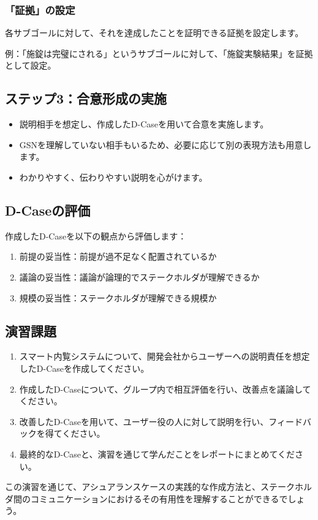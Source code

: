 \subsubsection{「証拠」の設定}
各サブゴールに対して、それを達成したことを証明できる証拠を設定します。

例：「施錠は完璧にされる」というサブゴールに対して、「施錠実験結果」を証拠として設定。

\subsection{ステップ3：合意形成の実施}

\begin{itemize}
    \item 説明相手を想定し、作成したD-Caseを用いて合意を実施します。
    \item GSNを理解していない相手もいるため、必要に応じて別の表現方法も用意します。
    \item わかりやすく、伝わりやすい説明を心がけます。
\end{itemize}

\subsection{D-Caseの評価}

作成したD-Caseを以下の観点から評価します：

\begin{enumerate}
    \item 前提の妥当性：前提が過不足なく配置されているか
    \item 議論の妥当性：議論が論理的でステークホルダが理解できるか
    \item 規模の妥当性：ステークホルダが理解できる規模か
\end{enumerate}

\subsection{演習課題}

\begin{enumerate}
    \item スマート内覧システムについて、開発会社からユーザーへの説明責任を想定したD-Caseを作成してください。
    \item 作成したD-Caseについて、グループ内で相互評価を行い、改善点を議論してください。
    \item 改善したD-Caseを用いて、ユーザー役の人に対して説明を行い、フィードバックを得てください。
    \item 最終的なD-Caseと、演習を通じて学んだことをレポートにまとめてください。
\end{enumerate}

この演習を通じて、アシュアランスケースの実践的な作成方法と、ステークホルダ間のコミュニケーションにおけるその有用性を理解することができるでしょう。


